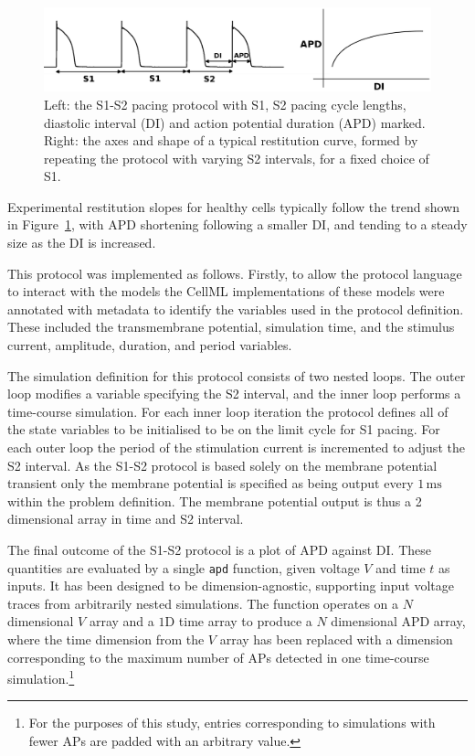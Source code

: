 \documentclass[preprint,authoryear,12pt]{elsarticle}
\newcommand{\code}[1]{\texttt{#1}}
\newcommand{\vu}[2]{\ensuremath{#1\,\mathrm{#2}}}
\begin{document}
\begin{figure}
\begin{center}
\includegraphics[width=1.0\linewidth]{S1S2}
\caption{Left: the S1-S2 pacing protocol with S1, S2 pacing cycle lengths,
diastolic interval (DI) and action potential duration (APD) marked. Right: the
axes and shape of a typical restitution curve, formed by repeating the protocol
with varying S2 intervals, for a fixed choice of S1.}
\label{fig:S1S2Intro}
\end{center}
\end{figure}

Experimental restitution slopes for healthy cells typically follow the trend
shown in Figure~\ref{fig:S1S2Intro}, with APD shortening following a smaller DI,
and tending to a steady size as the DI is increased.


This protocol was implemented as follows.
Firstly, to allow the protocol language to interact with the models the CellML implementations of these models were annotated with metadata to identify the variables used in the protocol definition.
These included the transmembrane potential, simulation time, and the stimulus current, amplitude, duration, and period variables. 


The simulation definition for this protocol consists of two nested loops.
The outer loop modifies a variable specifying the S2 interval, and the inner loop performs a time-course simulation.
For each inner loop iteration the protocol defines all of the state variables to be initialised to be on the limit cycle for S1 pacing.
For each outer loop the period of the stimulation current is incremented to adjust the S2 interval.
As the S1-S2 protocol is based solely on the membrane potential transient only the membrane potential is specified as being output every \vu{1}{ms} within the problem definition.
The membrane potential output is thus a 2 dimensional array in time and S2 interval.


The final outcome of the S1-S2 protocol is a plot of APD against DI.
These quantities are evaluated by a single \code{apd} function, given voltage $V$ and time $t$ as inputs.
It has been designed to be dimension-agnostic, supporting input voltage traces from arbitrarily nested simulations.
The function operates on a $N$ dimensional $V$ array and a $1$D time array to produce a $N$ dimensional APD array, where the time dimension from the $V$ array has been replaced with a dimension corresponding to the maximum number of APs detected in one time-course simulation.\footnote{%
For the purposes of this study, entries corresponding to simulations with fewer APs are padded with an arbitrary value.}
\end{document}
